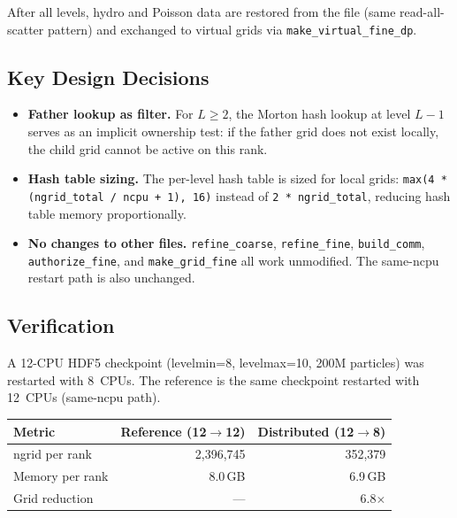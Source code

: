 \documentclass[11pt,fleqn]{book}
\begin{document}
After all levels, hydro and Poisson data are restored from the file (same read-all-scatter pattern) and exchanged to virtual grids via \texttt{make\_virtual\_fine\_dp}.

\subsection{Key Design Decisions}

\begin{itemize}
  \item \textbf{Father lookup as filter.}
    For $L \geq 2$, the Morton hash lookup at level $L-1$ serves as an implicit ownership test: if the father grid does not exist locally, the child grid cannot be active on this rank.
  \item \textbf{Hash table sizing.}
    The per-level hash table is sized for local grids: \texttt{max(4 * (ngrid\_total / ncpu + 1), 16)} instead of \texttt{2 * ngrid\_total}, reducing hash table memory proportionally.
  \item \textbf{No changes to other files.}
    \texttt{refine\_coarse}, \texttt{refine\_fine}, \texttt{build\_comm}, \texttt{authorize\_fine}, and \texttt{make\_grid\_fine} all work unmodified.
    The same-ncpu restart path is also unchanged.
\end{itemize}

\subsection{Verification}

A 12-CPU HDF5 checkpoint (levelmin=8, levelmax=10, 200M particles) was restarted with 8~CPUs.  The reference is the same checkpoint restarted with 12~CPUs (same-ncpu path).

\begin{center}
\begin{tabular}{lrr}
\toprule
\textbf{Metric} & \textbf{Reference (12$\to$12)} & \textbf{Distributed (12$\to$8)} \\
\midrule
ngrid per rank       & 2,396,745    & 352,379   \\
Memory per rank      & 8.0\,GB      & 6.9\,GB   \\
Grid reduction       & ---          & 6.8$\times$ \\
\bottomrule
\end{tabular}
\end{center}
\end{document}
